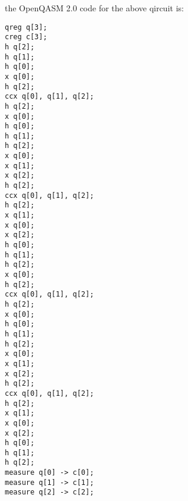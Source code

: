 \documentclass{article}
\begin{document}
\begin{center}
\end{center}


the OpenQASM 2.0 code for the above qircuit is: 


\begin{verbatim}
qreg q[3];
creg c[3];
h q[2];
h q[1];
h q[0];
x q[0];
h q[2];
ccx q[0], q[1], q[2];
h q[2];
x q[0];
h q[0];
h q[1];
h q[2];
x q[0];
x q[1];
x q[2];
h q[2];
ccx q[0], q[1], q[2];
h q[2];
x q[1];
x q[0];
x q[2];
h q[0];
h q[1];
h q[2];
x q[0];
h q[2];
ccx q[0], q[1], q[2];
h q[2];
x q[0];
h q[0];
h q[1];
h q[2];
x q[0];
x q[1];
x q[2];
h q[2];
ccx q[0], q[1], q[2];
h q[2];
x q[1];
x q[0];
x q[2];
h q[0];
h q[1];
h q[2];
measure q[0] -> c[0];
measure q[1] -> c[1];
measure q[2] -> c[2];
\end{verbatim}
\clearpage
\end{document}
